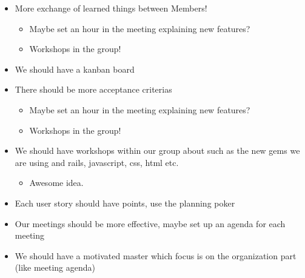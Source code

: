 \documentclass[a4paper]{article}
\begin{document}
\begin{itemize}
\begin{itemize}
	\end{itemize}
	\item More exchange of learned things between Members!
	\begin{itemize}
		\item Maybe set an hour in the meeting explaining new features?
		\item Workshops in the group!
	\end{itemize}
	\item We should have a kanban board
	\item There should be more acceptance criterias
	\begin{itemize}
		\item Maybe set an hour in the meeting explaining new features?
		\item Workshops in the group!
	\end{itemize}
	\item We should have workshops within our group about 	such as the new gems we are using and rails, javascript, css, html etc.
	\begin{itemize}
		\item Awesome idea.
	\end{itemize}
	\item Each user story should have points, use the planning poker
	\item Our meetings should be more effective, maybe set up an agenda for each meeting
	\item We should have a motivated master which focus is on the organization part (like meeting agenda)
\end{itemize}
\end{document}
